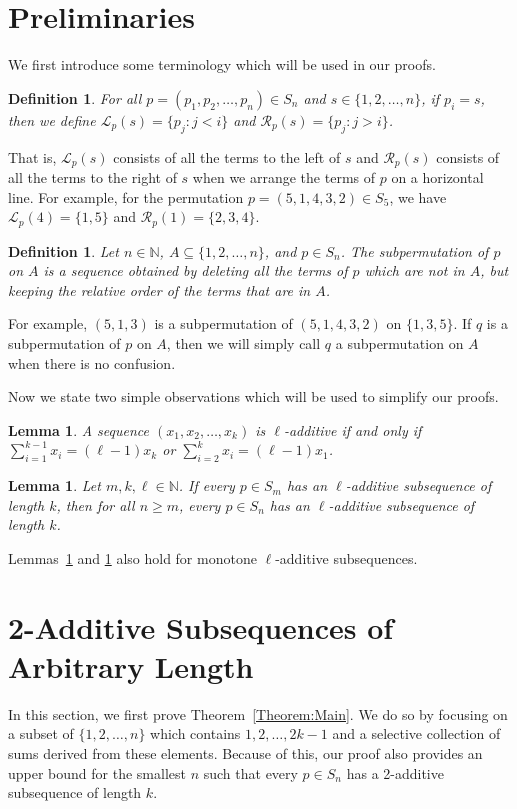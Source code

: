\documentclass[10pt,a4paper]{amsart}
\newtheorem{lemma}[theorem]{Lemma}
\newtheorem{definition}[theorem]{Definition}
\begin{document}
\section{Preliminaries}\label{Section:Pre}

We first introduce some terminology which will be used in our proofs.

\begin{definition}
    For all $p=(p_1,p_2,\ldots,p_n)\in S_n$ and $s\in\{1,2,\ldots,n\}$, if $p_i=s$, then we define $\mathcal{L}_p(s)=\{p_j:j<i\}$ and $\mathcal{R}_p(s)=\{p_j:j>i\}$.
\end{definition}
That is, $\mathcal{L}_p(s)$ consists of all the terms to the left of $s$ and $\mathcal{R}_p(s)$ consists of all the terms to the right of $s$ when we arrange the terms of $p$ on a horizontal line. For example, for the permutation $p=(5,1,4,3,2)\in S_5$, we have $\mathcal{L}_p(4)=\{1,5\}$ and $\mathcal{R}_p(1)=\{2,3,4\}$.

\begin{definition}
    Let $n\in\mathbb{N}$, $A\subseteq\{1,2,\ldots,n\}$, and $p\in S_n$. The subpermutation of $p$ on $A$ is a sequence obtained by deleting all the terms of $p$ which are not in $A$, but keeping the relative order of the terms that are in $A$.
\end{definition}
For example, $(5,1,3)$ is a subpermutation of $(5,1,4,3,2)$ on $\{1,3,5\}$. If $q$ is a subpermutation of $p$ on $A$, then we will simply call $q$ a subpermutation on $A$ when there is no confusion.


Now we state two simple observations which will be used to simplify our proofs.
\begin{lemma}\label{Lemma:Fromltol-1}
    A sequence $(x_1,x_2,\ldots,x_k)$ is $\ell$-additive if and only if $\sum_{i=1}^{k-1}x_i=(\ell-1)x_k$ or $\sum_{i=2}^kx_i=(\ell-1)x_1$.
\end{lemma}
\begin{lemma}\label{Lemma:FromAll-nToSome-n}
Let $m,k,\ell\in\mathbb{N}$. If every $p\in S_m$ has an $\ell$-additive subsequence of length $k$, then for all $n\geq m$, every $p\in S_n$ has an $\ell$-additive subsequence of length $k$. 
\end{lemma}

Lemmas~\ref{Lemma:Fromltol-1} and \ref{Lemma:FromAll-nToSome-n} also hold for monotone $\ell$-additive subsequences.
\section{2-Additive Subsequences of Arbitrary Length}\label{Section:2-Add}
In this section, we first prove Theorem~\ref{Theorem:Main}. We do so by focusing on a subset of $\{1,2,\ldots,n\}$ which contains $1,2,\ldots,2k-1$ and a selective collection of sums derived from these elements. Because of this, our proof also provides an upper bound for the smallest $n$ such that every $p\in S_n$ has a 2-additive subsequence of length $k$. 
\end{document}
